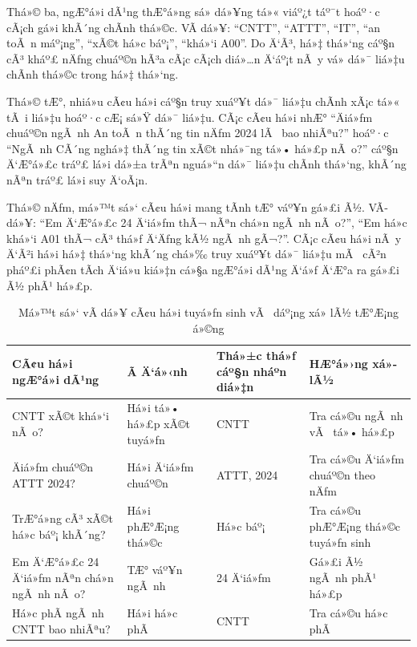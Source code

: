 ﻿\documentclass[12pt,a4paper]{report}
\begin{document}
Thá»© ba, ngÆ°á»i dÃ¹ng thÆ°á»ng sá»­ dá»¥ng tá»« viáº¿t táº¯t hoáº·c cÃ¡ch gá»i khÃ´ng chÃ­nh thá»©c. VÃ­ dá»¥: ``CNTT'', ``ATTT'', ``IT'', ``an toÃ n máº¡ng'', ``xÃ©t há»c báº¡'', ``khá»‘i A00''. Do Ä‘Ã³, há»‡ thá»‘ng cáº§n cÃ³ kháº£ nÄƒng chuáº©n hÃ³a cÃ¡c cÃ¡ch diá»…n Ä‘áº¡t nÃ y vá» dá»¯ liá»‡u chÃ­nh thá»©c trong há»‡ thá»‘ng.

Thá»© tÆ°, nhiá»u cÃ¢u há»i cáº§n truy xuáº¥t dá»¯ liá»‡u chÃ­nh xÃ¡c tá»« tÃ i liá»‡u hoáº·c cÆ¡ sá»Ÿ dá»¯ liá»‡u. CÃ¡c cÃ¢u há»i nhÆ° ``Äiá»ƒm chuáº©n ngÃ nh An toÃ n thÃ´ng tin nÄƒm 2024 lÃ  bao nhiÃªu?'' hoáº·c ``NgÃ nh CÃ´ng nghá»‡ thÃ´ng tin xÃ©t nhá»¯ng tá»• há»£p nÃ o?'' cáº§n Ä‘Æ°á»£c tráº£ lá»i dá»±a trÃªn nguá»“n dá»¯ liá»‡u chÃ­nh thá»‘ng, khÃ´ng nÃªn tráº£ lá»i suy Ä‘oÃ¡n.

Thá»© nÄƒm, má»™t sá»‘ cÃ¢u há»i mang tÃ­nh tÆ° váº¥n gá»£i Ã½. VÃ­ dá»¥: ``Em Ä‘Æ°á»£c 24 Ä‘iá»ƒm thÃ¬ nÃªn chá»n ngÃ nh nÃ o?'', ``Em há»c khá»‘i A01 thÃ¬ cÃ³ thá»ƒ Ä‘Äƒng kÃ½ ngÃ nh gÃ¬?''. CÃ¡c cÃ¢u há»i nÃ y Ä‘Ã²i há»i há»‡ thá»‘ng khÃ´ng chá»‰ truy xuáº¥t dá»¯ liá»‡u mÃ  cÃ²n pháº£i phÃ¢n tÃ­ch Ä‘iá»u kiá»‡n cá»§a ngÆ°á»i dÃ¹ng Ä‘á»ƒ Ä‘Æ°a ra gá»£i Ã½ phÃ¹ há»£p.

\begin{table}[H]
    \centering
    \caption{Má»™t sá»‘ vÃ­ dá»¥ cÃ¢u há»i tuyá»ƒn sinh vÃ  dáº¡ng xá»­ lÃ½ tÆ°Æ¡ng á»©ng}
    \label{tab:admission_question_examples}
    \begin{tabular}{|p{4.1cm}|p{3.2cm}|p{3.1cm}|p{3.8cm}|}
        \hline
        \textbf{CÃ¢u há»i ngÆ°á»i dÃ¹ng} & \textbf{Ã Ä‘á»‹nh} & \textbf{Thá»±c thá»ƒ cáº§n nháº­n diá»‡n} & \textbf{HÆ°á»›ng xá»­ lÃ½} \\ \hline
        CNTT xÃ©t khá»‘i nÃ o? & Há»i tá»• há»£p xÃ©t tuyá»ƒn & CNTT & Tra cá»©u ngÃ nh vÃ  tá»• há»£p \\ \hline
        Äiá»ƒm chuáº©n ATTT 2024? & Há»i Ä‘iá»ƒm chuáº©n & ATTT, 2024 & Tra cá»©u Ä‘iá»ƒm chuáº©n theo nÄƒm \\ \hline
        TrÆ°á»ng cÃ³ xÃ©t há»c báº¡ khÃ´ng? & Há»i phÆ°Æ¡ng thá»©c & Há»c báº¡ & Tra cá»©u phÆ°Æ¡ng thá»©c tuyá»ƒn sinh \\ \hline
        Em Ä‘Æ°á»£c 24 Ä‘iá»ƒm nÃªn chá»n ngÃ nh nÃ o? & TÆ° váº¥n ngÃ nh & 24 Ä‘iá»ƒm & Gá»£i Ã½ ngÃ nh phÃ¹ há»£p \\ \hline
        Há»c phÃ­ ngÃ nh CNTT bao nhiÃªu? & Há»i há»c phÃ­ & CNTT & Tra cá»©u há»c phÃ­ \\ \hline
    \end{tabular}
\end{table}
\end{document}
